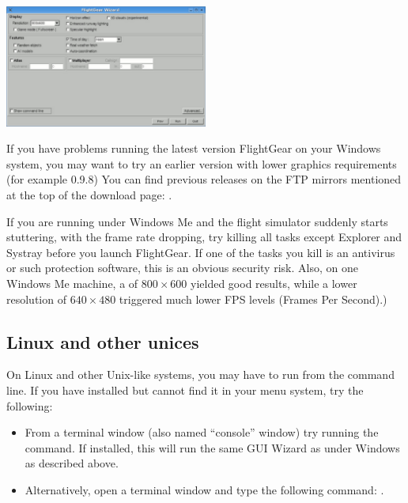 \begin{center}
\includegraphics[width=0.5\textwidth]{img/tut_4}
\end{center}

If you have problems running the latest version FlightGear on
your Windows system, you may want to try an earlier version with lower
graphics requirements (for example 0.9.8) You can find previous releases on 
the FTP mirrors mentioned at the top of the \FlightGear{} download page:
.
   
If you are running under Windows Me and the flight simulator suddenly starts
stuttering, with the frame rate dropping, 
try killing all tasks except Explorer and Systray before you
launch FlightGear. If one of the tasks you kill is an antivirus or
such protection software, this is an obvious security risk. Also, on one
Windows Me machine, a \FlightGear{} of $800\times600$ yielded good results,
while a lower resolution of $640\times480$ triggered much lower FPS levels 
(Frames Per Second).)

\subsection{Linux and other unices}

On Linux and other Unix-like systems, you may have to run \FlightGear{} from 
the command line. If you have installed \FlightGear{} but cannot find it 
in your menu system, try the 
following:

\begin{itemize}
  \item From a terminal window (also named ``console'' window) try
  running the   command. If installed, this will run the same 
  GUI Wizard as under Windows as described above.

	\item Alternatively, open a terminal window and type the following command:
  . 
\end{itemize}

